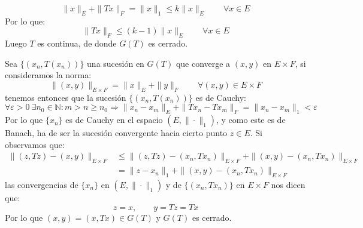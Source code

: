\documentclass[12pt]{article}
\begin{document}
\begin{ejercicio}[3.5 Puntos]
\begin{description}
\begin{description}
                        \begin{equation*}
                            \|x\|_E + \|Tx\|_F = \|x\|_1 \leq k\|x\|_E \qquad \forall x\in E
                        \end{equation*}
                        Por lo que:
                        \begin{equation*}
                            \|Tx\|_F \leq (k-1)\|x\|_E \qquad \forall x\in E
                        \end{equation*}
                        Luego $T$ es continua, de donde $G(T)$ es cerrado.
                    \item [Opción 2.] Sea $\{(x_n,T(x_n))\}$ una sucesión en $G(T)$ que converge a $(x,y)$ en $E\times F$, si consideramos la norma:
                        \begin{equation*}
                            \|(x,y)\|_{E\times F} = \|x\|_E + \|y\|_F \qquad \forall (x,y)\in E\times F
                        \end{equation*}
                        tenemos entonces que la sucesión $\{(x_n,T(x_n))\}$ es de Cauchy:
                        \begin{equation*}
                            \forall \varepsilon>0~\exists n_0\in \mathbb{N} : m>n\geq n_0 \Longrightarrow \|x_n-x_m\|_E + \|Tx_n - Tx_m\|_F = \|x_n-x_m\|_1 < \varepsilon
                        \end{equation*}
                        Por lo que $\{x_n\}$ es de Cauchy en el espacio $(E,\|\cdot \|_1)$, y como este es de Banach, ha de ser la sucesión convergente hacia cierto punto $z\in E$. Si observamos que:
                        \begin{align*}
                            \|(z,Tz) - (x,y)\|_{E\times F} &\leq \|(z,Tz) - (x_n,Tx_n)\|_{E\times F} + \|(x,y) - (x_n,Tx_n)\|_{E\times F} \\
                                                           &= \|z-x_n\|_1 + \|(x,y)-(x_n,Tx_n)\|_{E\times F}
                        \end{align*}
                        las convergencias de $\{x_n\}$ en $(E,\|\cdot \|_1)$ y de $\{(x_n,Tx_n)\}$ en $E\times F$ nos dicen que:
                        \begin{equation*}
                            z=x, \qquad y=Tz = Tx
                        \end{equation*}
                        Por lo que $(x,y) = (x,Tx)\in G(T)$ y $G(T)$ es cerrado.
                \end{description}


\end{description}
\end{ejercicio}
\end{document}
